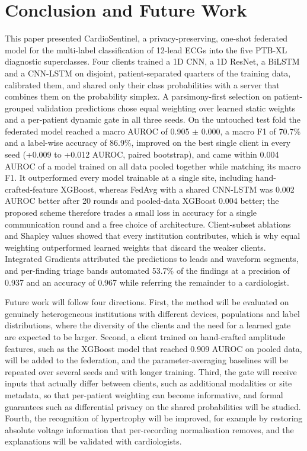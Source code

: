 \section{Conclusion and Future Work}
\label{sec:conclusion}

This paper presented CardioSentinel, a privacy-preserving, one-shot federated model for the multi-label
classification of 12-lead ECGs into the five PTB-XL diagnostic superclasses. Four clients trained a
1D CNN, a 1D ResNet, a BiLSTM and a CNN-LSTM on disjoint, patient-separated quarters of the training
data, calibrated them, and shared only their class probabilities with a server that combines them on
the probability simplex. A parsimony-first selection on patient-grouped validation predictions chose
equal weighting over learned static weights and a per-patient dynamic gate in all three seeds. On the
untouched test fold the federated model reached a macro AUROC of 0.905 $\pm$ 0.000, a macro F1 of
70.7\% and a label-wise accuracy of 86.9\%, improved on the best single client in every seed
(+0.009 to +0.012 AUROC, paired bootstrap), and came within 0.004 AUROC of a model trained on all
data pooled together while matching its macro F1. It outperformed every model trainable at a single
site, including hand-crafted-feature XGBoost, whereas FedAvg with a shared CNN-LSTM was 0.002 AUROC
better after 20 rounds and pooled-data XGBoost 0.004 better; the proposed scheme therefore trades a small
loss in accuracy for a single communication round and a free choice of architecture. Client-subset ablations and Shapley values showed
that every institution contributes, which is why equal weighting outperformed learned weights that
discard the weaker clients. Integrated Gradients attributed the predictions to leads and waveform
segments, and per-finding triage bands automated 53.7\% of the findings at a precision of 0.937 and an
accuracy of 0.967 while referring the remainder to a cardiologist.

Future work will follow four directions. First, the method will be evaluated on genuinely
heterogeneous institutions with different devices, populations and label distributions, where the
diversity of the clients and the need for a learned gate are expected to be larger. Second, a client
trained on hand-crafted amplitude features, such as the XGBoost model that reached 0.909 AUROC on pooled
data, will be added to the federation, and the parameter-averaging baselines will be repeated over
several seeds and with longer training. Third, the gate will receive inputs that actually differ between
clients, such as additional modalities or site metadata, so that per-patient weighting can become
informative, and formal guarantees such as differential privacy on the shared probabilities will be
studied. Fourth, the recognition of hypertrophy will be improved, for example by restoring absolute
voltage information that per-recording normalisation removes, and the explanations will be validated
with cardiologists.
